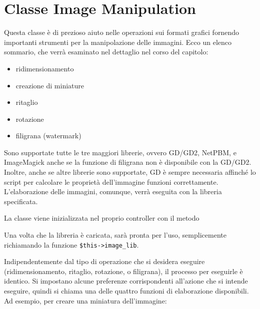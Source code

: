 \section{Classe Image Manipulation}
\label{class:image}

Questa classe è di prezioso aiuto nelle operazioni sui formati grafici fornendo importanti strumenti per la manipolazione delle immagini. Ecco un elenco sommario, che verrà esaminato nel dettaglio nel corso del capitolo:

\begin{itemize}
\item ridimensionamento
\item creazione di miniature
\item ritaglio 
\item rotazione
\item filigrana (watermark)
\end{itemize}

Sono supportate tutte le tre maggiori librerie, ovvero GD/GD2, NetPBM, e ImageMagick anche se la funzione di filigrana non è disponibile con la GD/GD2. Inoltre, anche se altre librerie sono supportate, GD è sempre necessaria affinché lo script per calcolare le proprietà dell'immagine funzioni correttamente. L'elaborazione delle immagini, comunque, verrà eseguita con la libreria specificata.

La classe viene inizializzata nel proprio controller con il metodo 


Una volta che la libreria è caricata, sarà pronta per l'uso, semplicemente richiamando la funzione \verb|$this->image_lib|.

Indipendentemente dal tipo di operazione che si desidera eseguire (ridimensionamento, ritaglio, rotazione, o filigrana), il processo per eseguirle è identico. Si impostano alcune preferenze corrispondenti all'azione che si intende eseguire, quindi si chiama una delle quattro funzioni di elaborazione disponibili. Ad esempio, per creare una miniatura dell'immagine:


